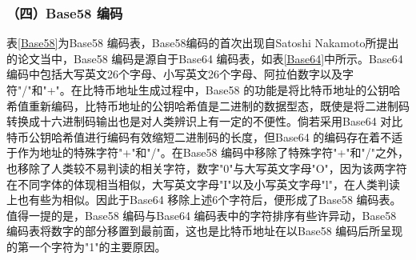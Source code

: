 				

					

				\subsubsection{（四）Base58 编码}

				表\ref{Base58}为Base58 编码表，Base58编码的首次出现自Satoshi Nakamoto所提出的论文\supercite{bitcoinpaper}当中，Base58 编码是源自于Base64 编码表，如表\ref{Base64}中所示。Base64 编码中包括大写英文26个字母、小写英文26个字母、阿拉伯数字以及字符"/"和"+"。在比特币地址生成过程中，Base58 的功能是将比特币地址的公钥哈希值重新编码，比特币地址的公钥哈希值是二进制的数据型态，既使是将二进制码转换成十六进制码输出也是对人类辨识上有一定的不便性。倘若采用Base64 对比特币公钥哈希值进行编码有效缩短二进制码的长度，但Base64 的编码存在着不适于作为地址的特殊字符"+"和"/"。在Base58 编码中移除了特殊字符"+"和"/"之外，也移除了⼈类较不易判读的相关字符，数字"0"与大写英文字母"O"，因为该两字符在不同字体的体现相当相似，大写英文字母"I"以及小写英文字母"l"，在人类判读上也有些为相似。因此于Base64 移除上述6个字符后，便形成了Base58 编码表。值得一提的是，Base58 编码与Base64 编码表中的字符排序有些许异动，Base58 编码表将数字的部分移置到最前面，这也是比特币地址在以Base58 编码后所呈现的第一个字符为"1"的主要原因。

